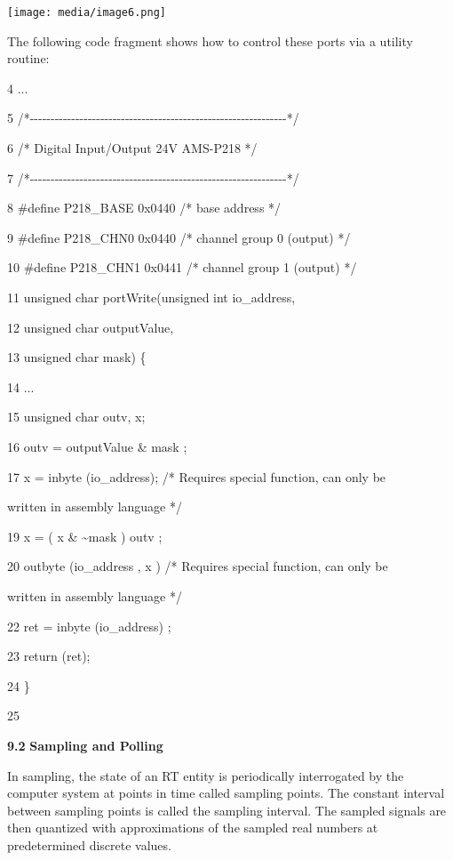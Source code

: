 \texttt{[image: media/image6.png]}

The following code fragment shows how to control these ports via a
utility routine:

4 ...

5
/*-\/-\/-\/-\/-\/-\/-\/-\/-\/-\/-\/-\/-\/-\/-\/-\/-\/-\/-\/-\/-\/-\/-\/-\/-\/-\/-\/-\/-\/-\/-\/-\/-\/-\/-\/-\/-\/-\/-\/-\/-\/-\/-\/-\/-\/-\/-\/-\/-\/-\/-\/-\/-\/-\/-\/-\/-\/-\/-\/-\/-\/-*/

6 /* Digital Input/Output 24V AMS-P218 */

7
/*-\/-\/-\/-\/-\/-\/-\/-\/-\/-\/-\/-\/-\/-\/-\/-\/-\/-\/-\/-\/-\/-\/-\/-\/-\/-\/-\/-\/-\/-\/-\/-\/-\/-\/-\/-\/-\/-\/-\/-\/-\/-\/-\/-\/-\/-\/-\/-\/-\/-\/-\/-\/-\/-\/-\/-\/-\/-\/-\/-\/-\/-*/

8 \#define P218\_BASE 0x0440 /* base address */

9 \#define P218\_CHN0 0x0440 /* channel group 0 (output) */

10 \#define P218\_CHN1 0x0441 /* channel group 1 (output) */

11 unsigned char portWrite(unsigned int io\_address,

12 unsigned char outputValue,

13 unsigned char mask) \{

14 ...

15 unsigned char outv, x;

16 outv = outputValue \& mask ;

17 x = inbyte (io\_address); /* Requires special function, can only be

written in assembly language */

19 x = ( x \& \textasciitilde{}mask ) \textbar{} outv ;

20 outbyte (io\_address , x ) /* Requires special function, can only be

written in assembly language */

22 ret = inbyte (io\_address) ;

23 return (ret);

24 \}

25

\textbf{9.2} \protect\hypertarget{teil3}{}{}\textbf{Sampling and
Polling}

In sampling, the state of an RT entity is periodically interrogated by
the computer system at points in time called sampling points. The
constant interval between sampling points is called the sampling
interval. The sampled signals are then quantized with approximations of
the sampled real numbers at predetermined discrete values.


